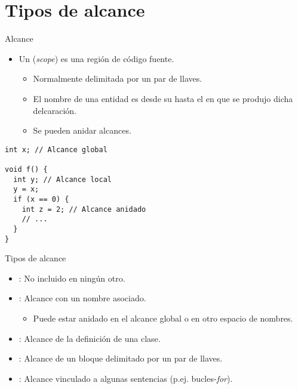 \section{Tipos de alcance}

\begin{frame}[t,fragile]{Alcance}
\begin{itemize}
  \item Un  (\emph{scope}) es una región de código fuente.
    \begin{itemize}
      \item Normalmente delimitada por un par de llaves.
      \item El nombre de una entidad es  
            desde su  hasta el
             en que se produjo dicha delcaración.
      \item Se pueden anidar alcances.
    \end{itemize}
\end{itemize}
\begin{lstlisting}
int x; // Alcance global

void f() {
  int y; // Alcance local
  y = x;
  if (x == 0) {
    int z = 2; // Alcance anidado
    // ...
  }
}
\end{lstlisting}
\end{frame}

\begin{frame}[t]{Tipos de alcance}
\begin{itemize}
  \item {}: No incluido en ningún otro.
  \item {}: Alcance con un nombre asociado.
    \begin{itemize}
      \item Puede estar anidado en el alcance global o en otro espacio de nombres.
    \end{itemize}
  \item {}: Alcance de la definición de una clase.
  \item {}: Alcance de un bloque delimitado por un par de llaves.
  \item {}: Alcance vinculado a algunas sentencias (p.ej. bucles-\emph{for}).
\end{itemize}
\end{frame}

